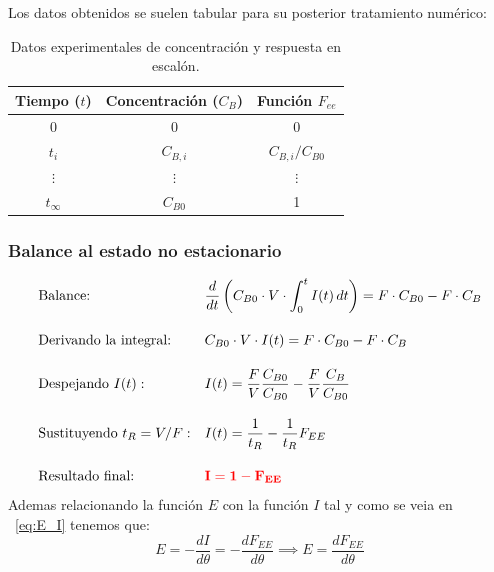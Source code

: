 \noindent Los datos obtenidos se suelen tabular para su posterior tratamiento numérico:

\begin{table}[htbp]
    \centering
    \begin{tabular}{ccc}
        \hline
        \textbf{Tiempo ($t$)} & \textbf{Concentración ($C_{B}$)} & \textbf{Función $F_{ee}$} \\ \hline
        0                     & 0                                & 0                         \\
        $t_i$                 & $C_{B,i}$                        & $C_{B,i}/C_{B0}$          \\
        $\vdots$              & $\vdots$                         & $\vdots$                  \\
        $t_{\infty}$          & $C_{B0}$                         & 1                         \\ \hline
    \end{tabular}
    \caption{Datos experimentales de concentración y respuesta en escalón.}
    \label{tab:concentracion_tiempo}
\end{table}
\subsubsection{Balance al estado no estacionario}
\begin{alignat}{2}
     & \text{Balance: }                &  & \frac{d}{dt} \left( C_{B0} \cdot V \cdot \int_{0}^{t} I(t) \, dt \right) = F \cdot C_{B0} - F \cdot C_B \nonumber \\[10pt]
     & \text{Derivando la integral: }  &  & C_{B0} \cdot V \cdot I(t) = F \cdot C_{B0} - F \cdot C_B                                                \nonumber \\[10pt]
     & \text{Despejando } I(t):        &  & I(t) = \frac{F}{V} \frac{C_{B0}}{C_{B0}} - \frac{F}{V} \frac{C_B}{C_{B0}}                               \nonumber \\[10pt]
     & \text{Sustituyendo } t_R = V/F: &  & I(t) = \frac{1}{t_R} - \frac{1}{t_R} F_{EE}                                                             \nonumber \\[10pt]
     & \text{Resultado final: }        &  & \mathbf{\color{red} I = 1 - F_{EE}}
\end{alignat}
\noindent Ademas relacionando la función $E$ con la función $I$ tal y como se veia en ~\eqref{eq:E_I} tenemos que:
\begin{equation}
    E = -\frac{dI}{d\theta} = -\frac{dF_{EE}}{d\theta } \implies\boxed{E = \frac{dF_{EE}}{d\theta}}
\end{equation}
